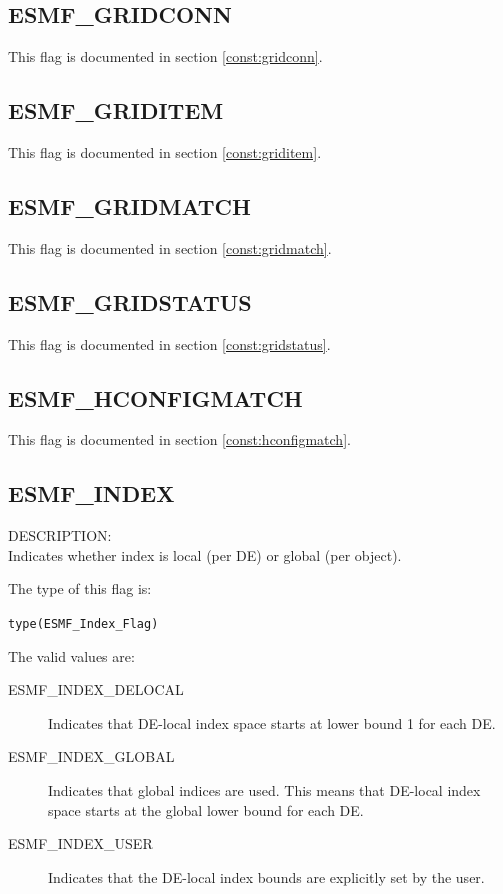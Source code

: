 \subsection{ESMF\_GRIDCONN}
This flag is documented in section \ref{const:gridconn}.

\subsection{ESMF\_GRIDITEM}
This flag is documented in section \ref{const:griditem}.

\subsection{ESMF\_GRIDMATCH}
This flag is documented in section \ref{const:gridmatch}.

\subsection{ESMF\_GRIDSTATUS}
This flag is documented in section \ref{const:gridstatus}.

\subsection{ESMF\_HCONFIGMATCH}
This flag is documented in section \ref{const:hconfigmatch}.

\subsection{ESMF\_INDEX}
\label{const:indexflag}
{\sf DESCRIPTION:\\}
Indicates whether index is local (per DE) or global (per object).

The type of this flag is:

{\tt type(ESMF\_Index\_Flag)}

The valid values are:
\begin{description}
\item [ESMF\_INDEX\_DELOCAL]
      Indicates that DE-local index space starts at lower bound 1 for each DE.
\item [ESMF\_INDEX\_GLOBAL]
      Indicates that global indices are used. This means that DE-local index
      space starts at the global lower bound for each DE.
\item [ESMF\_INDEX\_USER]
      Indicates that the DE-local index bounds are explicitly set by the user.
 \end{description}

